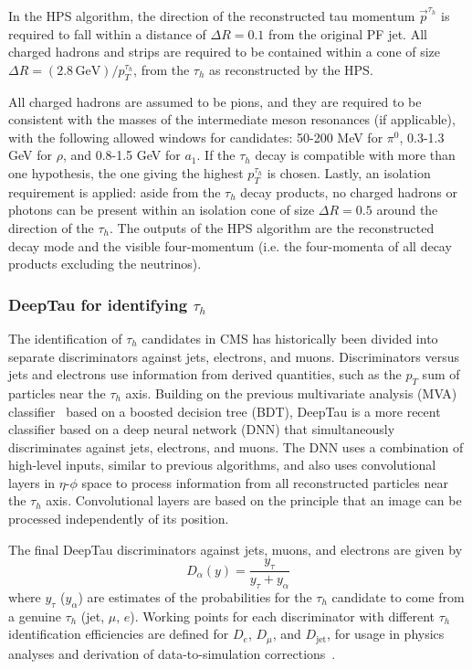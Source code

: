 In the HPS algorithm, the direction of the reconstructed tau momentum $\vec{p}^{\tau_{h}}$ is required to fall within a distance of $\Delta R = 0.1$ from the original PF jet. All charged hadrons and strips are required to be contained within a cone of size $\Delta R = (2.8 \,\text{GeV})/p_{T}^{\tau_{h}}$, from the $\tau_{h}$ as reconstructed by the HPS. 

All charged hadrons are assumed to be pions, and they are required to be consistent with the masses of the intermediate meson resonances (if applicable), with the following allowed windows for candidates: 50-200 MeV for $\pi^0$, 0.3-1.3 GeV for $\rho$, and 0.8-1.5 GeV for $a_1$. If the $\tau_{h}$ decay is compatible with more than one hypothesis, the one giving the highest $p_{T}^{\tau_{h}}$ is chosen. Lastly, an isolation requirement is applied: aside from the $\tau_{h}$ decay products, no charged hadrons or photons can be present within an isolation cone of size $\Delta R = 0.5$ around the direction of the $\tau_{h}$. The outputs of the HPS algorithm are the reconstructed decay mode and the visible four-momentum (i.e. the four-momenta of all decay products excluding the neutrinos).

\subsubsection{DeepTau for identifying \texorpdfstring{$\tau_{h}$}{tauh}}
The identification of $\tau_{h}$ candidates in CMS has historically been divided into separate discriminators against jets, electrons, and muons. Discriminators versus jets and electrons use information from derived quantities, such as the $p_{T}$ sum of particles near the $\tau_{h}$ axis. Building on the previous multivariate analysis (MVA) classifier~\cite{CMS-TAU-16-003} based on a boosted decision tree (BDT), DeepTau is a more recent classifier based on a deep neural network (DNN) that simultaneously discriminates against jets, electrons, and muons. The DNN uses a combination of high-level inputs, similar to previous algorithms, and also uses convolutional layers in $\eta$-$\phi$ space to process information from all reconstructed particles near the $\tau_{h}$ axis. Convolutional layers are based on the principle that an image can be processed independently of its position. 

The final DeepTau discriminators against jets, muons, and electrons are given by 
\begin{equation}
    D_\alpha(y) = \frac{y_{\tau}}{y_{\tau} + y_{\alpha}}
\end{equation}
where $y_\tau$ ($y_\alpha$) are estimates of the probabilities for the $\tau_{h}$ candidate to come from a genuine $\tau_{h}$ (jet, $\mu$, $e$). Working points for each discriminator with different $\tau_{h}$ identification efficiencies are defined for $D_{e}$, $D_{\mu}$, and $D_{\text{jet}}$, for usage in physics analyses and derivation of data-to-simulation corrections~\cite{2022-PRD-DeepTau}. 

